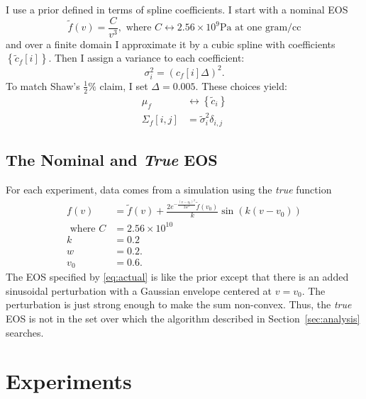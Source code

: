 \documentclass[11pt]{article}
\newcommand{\fnom}{\tilde f}
\newcommand\vol{v}        %
\newcommand{\eos}{f}
\newcommand{\eosnom}{\tilde f}
\newcommand\cf{c_f}
\begin{document}
I use a prior defined in terms of spline coefficients.  I start with a
nominal EOS
\begin{equation}
  \label{eq:2}
  \eosnom(\vol) = \frac{C}{\vol^3}, \text{ where } C \leftrightarrow
  2.56\times10^9 \text{Pa} \text{ at one gram/cc}
\end{equation}
and over a finite domain I approximate it by a cubic spline with
coefficients $\left\{\tilde \cf[i] \right\}$.  Then I assign a variance to
  each coefficient:
\begin{equation}
  \label{eq:3}
  \sigma^2_i = \left( \cf[i] \Delta \right)^2.
\end{equation}
To match Shaw's $\frac{1}{2} \%$ claim, I set $\Delta = 0.005$.  These
choices yield:
\begin{align*}
  \mu_\eos &\leftrightarrow \left\{\tilde c_i \right\} \\
  \Sigma_\eos[i,j] &= \tilde \sigma^2_i \delta_{i,j}
\end{align*}

\subsection{The Nominal and \emph{True} EOS}
\label{sec:true-eos}


\newcommand{\freq}{k} %
For each experiment, data comes from a simulation using the
\emph{true} function
\begin{align}
  \label{eq:actual}
  f(v) &= \fnom(v) + \frac{2 e^{-\frac{(v-v_0)^2}{2w^2}}
         \fnom(v_0)}{\freq}  \sin(\freq (v-v_0))\\
   \text{ where }C &= 2.56\times 10^{10} \nonumber \\
  \freq &= 0.2 \nonumber \\
  w &= 0.2. \nonumber \\
  v_0 &= 0.6. \nonumber
\end{align}
The EOS specified by \eqref{eq:actual} is like the prior except that
there is an added sinusoidal perturbation with a Gaussian envelope
centered at $v=v_0$.  The perturbation is just strong enough to make
the sum non-convex.  Thus, the \emph{true} EOS is not in the set over
which the algorithm described in Section~\ref{sec:analysis} searches.

\section{Experiments}
\label{sec:experiments}
\end{document}
